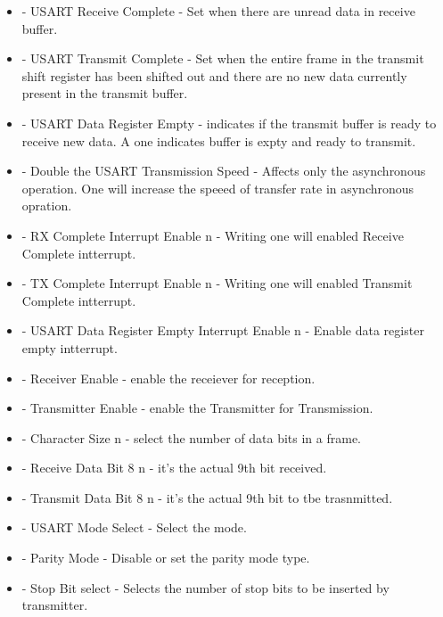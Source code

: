 \documentclass{article}
\begin{document}
\begin{itemize}
    \item {} - USART Receive Complete - Set when there are unread data in receive buffer.
    \item {} - USART Transmit Complete - Set when the entire frame in the transmit shift register has been shifted out and there are no new data currently present in the transmit buffer.
    \item {} - USART Data Register Empty - indicates if the transmit buffer is ready to receive new data. A one indicates buffer is expty and ready to transmit.
    \item {} - Double the USART Transmission Speed - Affects only the asynchronous operation. One will increase the speeed of transfer rate in asynchronous opration.
    \item {} - RX Complete Interrupt Enable n - Writing one will enabled Receive Complete intterrupt.
    \item {} - TX Complete Interrupt Enable n - Writing one will enabled Transmit Complete intterrupt.
    \item {} - USART Data Register Empty Interrupt Enable n - Enable data register empty intterrupt.
    \item {} - Receiver Enable - enable the receiever for reception.
    \item {} - Transmitter Enable - enable the Transmitter for Transmission.
    \item {} - Character Size n - select the number of data bits in a frame.
    \item {} - Receive Data Bit 8 n - it's the actual 9th bit received.
    \item {} - Transmit Data Bit 8 n -  it's the actual 9th bit to tbe trasnmitted.
    \item {} - USART Mode Select - Select the mode.
    \item {} - Parity Mode - Disable or set the parity mode type.
    \item {} - Stop Bit select - Selects the number of stop bits to be inserted by transmitter.
\end{itemize}
\end{document}
